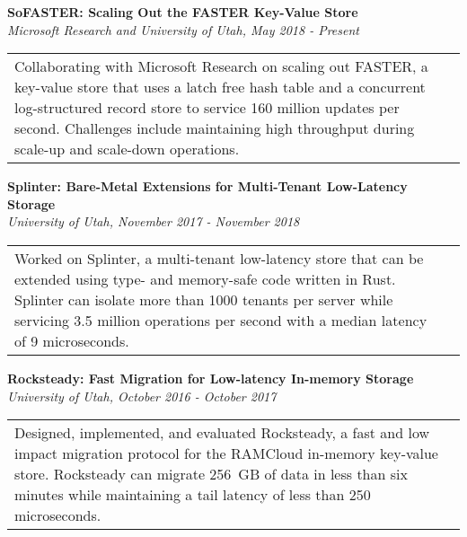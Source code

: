 \documentclass[margin,line]{res}
\begin{document}
\begin{resume}
\vspace{-2.5pt}
{\bf SoFASTER: Scaling Out the FASTER Key-Value Store}\\
{\small\em Microsoft Research and University of Utah, May 2018 - Present}\\
\begin{tabular}{@{}p{5.5in}p{4in}}
{\small Collaborating with Microsoft Research on scaling out FASTER, a
key-value store that uses a latch free hash table and a concurrent
log-structured record
store to service 160 million updates per second. Challenges include
maintaining high throughput during scale-up and scale-down operations.}
\end{tabular}

\vspace{-2.5pt}
{\bf Splinter: Bare-Metal Extensions for Multi-Tenant Low-Latency Storage}\\
{\small\em University of Utah, November 2017 - November 2018}\\
\begin{tabular}{@{}p{5.5in}p{4in}}
{\small Worked on Splinter, a multi-tenant low-latency store that can
be extended using type- and memory-safe code written in Rust. Splinter
can isolate more than 1000 tenants per server while servicing 3.5
million operations per second with a median latency of 9 microseconds.}
\end{tabular}

\vspace{-2.5pt}
{\bf Rocksteady: Fast Migration for Low-latency In-memory Storage}\\
{\small\em University of Utah, October 2016 - October 2017}\\
\begin{tabular}{@{}p{5.5in}p{4in}}
{\small Designed, implemented, and evaluated Rocksteady, a fast and
low impact migration protocol for the RAMCloud in-memory
key-value store. Rocksteady can migrate 256~GB of data in less
than six minutes while maintaining a tail latency of less than
250 microseconds.}
\end{tabular}



\end{resume}
\end{document}
